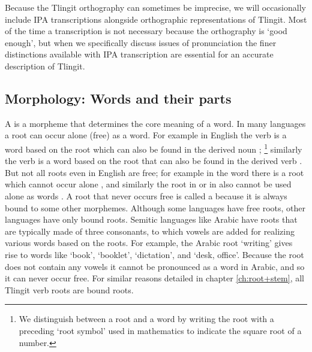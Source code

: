 Because the Tlingit orthography can sometimes be imprecise, we will occasionally include IPA transcriptions alongside orthographic representations of Tlingit.
Most of the time a transcription is not necessary because the orthography is ‘good enough’, but when we specifically discuss issues of pronunciation the finer distinctions available with IPA transcription are essential for an accurate description of Tlingit.

\subsection{Morphology: Words and their parts}\label{sec:intro-ling-morph}


A  is a morpheme that determines the core meaning of a word.
In many languages a root can occur alone (free) as a word.
For example in English the verb  is a word based on the root  which can also be found in the derived noun ;%
\footnote{We distinguish between a root and a word by writing the root with a preceding ‘root symbol’ \rtsym{} used in mathematics to indicate the square root of a number.}
similarly the verb  is a word based on the root  that can also be found in the derived verb  \parencite[42]{fromkin-rodman-hyams:2014}.
But not all roots even in English are free; for example in the word  there is a root  which cannot occur alone \parencite[66]{matthews:1991}, and similarly the root  in  or  in  also cannot be used alone as words \parencite[43]{fromkin-rodman-hyams:2014}.
A root that never occurs free is called a  because it is always bound to some other morphemes.
Although some languages have free roots, other languages have only bound roots.
Semitic languages like Arabic have roots that are typically made of three consonants, to which vowels are added for realizing various words based on the roots.
For example, the Arabic root  ‘writing’ gives rise to words like  ‘book’,  ‘booklet’,  ‘dictation’, and  ‘desk, office’.
Because the root  does not contain any vowels it cannot be pronounced as a word in Arabic, and so it can never occur free.
For similar reasons detailed in chapter \ref{ch:root+stem}, all Tlingit verb roots are bound roots.

